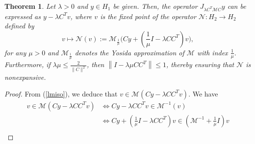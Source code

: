\documentclass[11pt]{article}
\def\beq{\begin{equation}}
\def\eeq{\end{equation}}
\def\baqn{\begin{eqnarray*}}
\def\eaqn{\end{eqnarray*}}
\theoremstyle{plain}
\newtheorem{theorem}{Theorem}
\newcommand{\tcb}{\textcolor{blue}}
\begin{document}
{%
{{
\begin{theorem}\label{tmf}
Let $\lambda > 0$ and $y \in H_1$ be given. Then, the operator $J_{\lambda C^T \mathcal{M} C} y$ can be expressed as $y - \lambda C^T v$, where $v$ is the fixed point of the operator $\mathcal{N}:H_2\to H_2$ defined by
$$v\mapsto\mathcal{N}(v) := \mathcal{M}_{\frac{1}{\mu}} \Big(Cy + (\frac{1}{\mu} I - \lambda CC^T)v\Big),$$
for any $\mu > 0$ and $\mathcal{M}_{\frac{1}{\mu}}$ denotes the Yosida approximation of $\mathcal{M}$ with index $\frac{1}{\mu}$.\\
 Furthermore, if ${\lambda}{\mu} \leq \frac{2}{\|C\|^2}$, then $\left\|I - {\lambda}{\mu} CC^T\right\| \leq 1$, thereby ensuring that $\mathcal{N}$ is {nonexpansive}.
\end{theorem}
}}
\begin{proof} 
{From (\ref{lmiso}), we deduce that $v \in \mathcal{M}(Cy - \lambda CC^T v)$. We have
\begin{align*}
v \in \mathcal{M}(Cy - \lambda CC^T v) 
&\Leftrightarrow Cy - \lambda CC^T v \in \mathcal{M}^{-1}(v) \\
&\Leftrightarrow Cy + (\frac{1}{\mu} I - \lambda CC^T)v \in (\mathcal{M}^{-1} + \frac{1}{\mu} I)v \\

\end{align*}}
\end{proof}}
\end{document}
